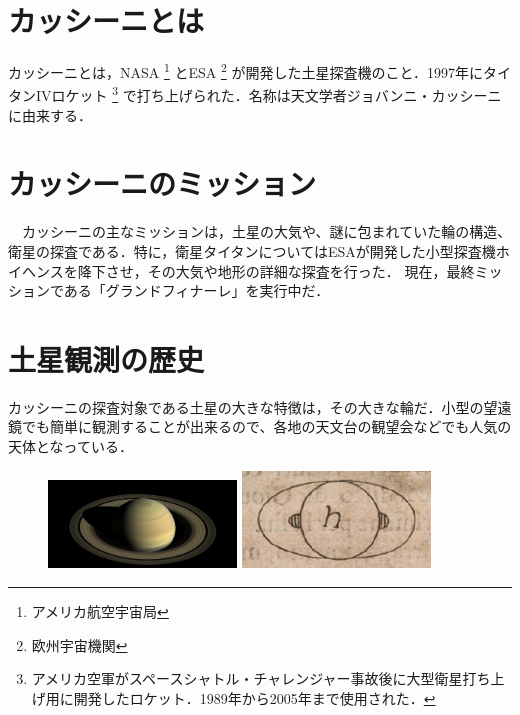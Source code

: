 \section{カッシーニとは}

カッシーニとは，NASA
\footnote{アメリカ航空宇宙局}
とESA
\footnote{欧州宇宙機関}
が開発した土星探査機のこと．1997年にタイタンIVロケット
\footnote{アメリカ空軍がスペースシャトル・チャレンジャー事故後に大型衛星打ち上げ用に開発したロケット．1989年から2005年まで使用された．}
で打ち上げられた．名称は天文学者ジョバンニ・カッシーニに由来する．

\section{カッシーニのミッション}
　カッシーニの主なミッションは，土星の大気や、謎に包まれていた輪の構造、衛星の探査である．特に，衛星タイタンについてはESAが開発した小型探査機ホイヘンスを降下させ，その大気や地形の詳細な探査を行った．
現在，最終ミッションである「グランドフィナーレ」を実行中だ．

\section{土星観測の歴史}
カッシーニの探査対象である土星の大きな特徴は，その大きな輪だ．小型の望遠鏡でも簡単に観測することが出来るので、各地の天文台の観望会などでも人気の天体となっている．

\begin{figure}[htbp]
	\begin{minipage}[t]{0.45\hsize}
        \centering
        \includegraphics[width=5cm]{img/saturn.png}
    \end{minipage}
	\begin{minipage}[t]{0.45\hsize}
        \centering
    	\includegraphics[width=5cm]{img/galileo-saturn-sketch.png}
    \end{minipage}
\end{figure}


